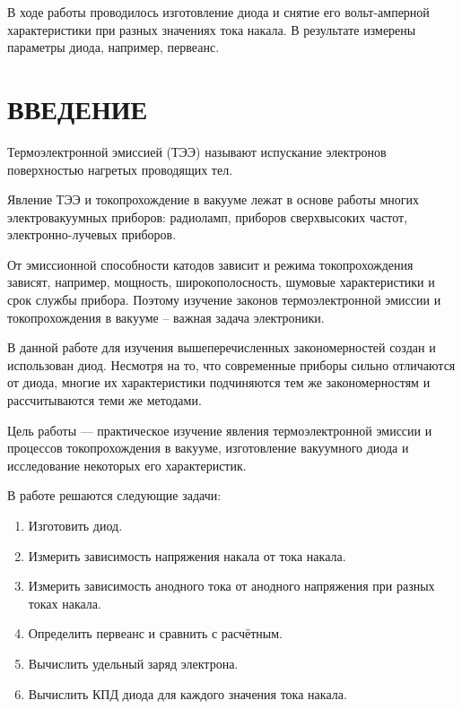 \documentclass[a4paper, 14pt]{extarticle}
\begin{document}
	В ходе работы проводилось изготовление диода и снятие его вольт-амперной характеристики при разных значениях тока накала.	В результате измерены параметры диода, например, первеанс.
	
	
	\tableofcontents
	
	
	\section*{ВВЕДЕНИЕ}
	
	\hspace{11mm} Термоэлектронной эмиссией (ТЭЭ) называют испускание электронов поверхностью нагретых проводящих тел. 
	
	Явление ТЭЭ и токопрохождение в вакууме лежат в основе работы многих электровакуумных приборов: радиоламп, приборов сверхвысоких частот, электронно-лучевых приборов. 
	
	От эмиссионной способности катодов зависит и режима токопрохождения зависят, например, мощность, широкополосность, шумовые характеристики и срок службы прибора. Поэтому изучение законов термоэлектронной эмиссии и токопрохождения в вакууме -- важная задача электроники. 
	
	В данной работе для изучения вышеперечисленных закономерностей создан и использован диод. Несмотря на то, что современные приборы сильно отличаются от диода, многие их характеристики подчиняются тем же закономерностям и рассчитываются теми же методами.
	
	Цель работы --- практическое изучение явления термоэлектронной эмиссии и процессов токопрохождения в вакууме, изготовление вакуумного диода и исследование некоторых его характеристик.
	
	В работе решаются следующие задачи:
	
	\begin{enumerate}
		\item Изготовить диод.
		\item Измерить зависимость напряжения накала от тока накала.
		\item Измерить зависимость анодного тока от анодного напряжения при разных токах накала.
		\item Определить первеанс и сравнить с расчётным.
		\item Вычислить удельный заряд электрона.
		\item Вычислить КПД диода для каждого значения тока накала.
	\end{enumerate}
	
\end{document}

